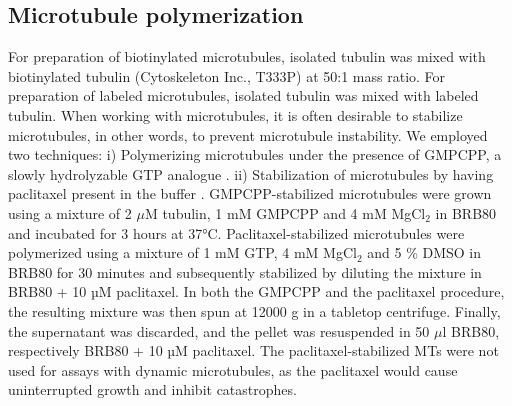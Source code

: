 \subsection{Microtubule polymerization}
For preparation of biotinylated microtubules, isolated tubulin was mixed with biotinylated tubulin (Cytoskeleton Inc., T333P) at 50:1 mass ratio. For preparation of labeled microtubules, isolated tubulin was mixed with labeled tubulin. When working with microtubules, it is often desirable to stabilize microtubules, in other words, to prevent microtubule instability. We employed two techniques: i) Polymerizing microtubules under the presence of GMPCPP, a slowly hydrolyzable GTP analogue \parencite{Hyman1992}. ii) Stabilization of microtubules by having paclitaxel present in the buffer \parencite{SCHIFF1979}. GMPCPP-stabilized microtubules were grown using a mixture of 2 $\mu$M tubulin, 1 mM GMPCPP and 4 mM MgCl$_2$ in BRB80 and incubated for 3 hours at 37°C. Paclitaxel-stabilized microtubules were polymerized using a mixture of 1 mM GTP, 4 mM MgCl$_2$ and 5 \% DMSO in BRB80 for 30 minutes and subsequently stabilized by diluting the mixture in BRB80 + 10 µM paclitaxel. In both the GMPCPP and the paclitaxel procedure, the resulting mixture was then spun at 12000 g in a tabletop centrifuge. Finally, the supernatant was discarded, and the pellet was resuspended in 50 $\mu$l BRB80, respectively BRB80 + 10 µM paclitaxel. The paclitaxel-stabilized MTs were not used for assays with dynamic microtubules, as the paclitaxel would cause uninterrupted growth and inhibit catastrophes.

